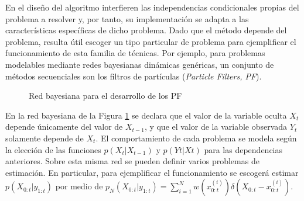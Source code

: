 En el diseño del algoritmo interfieren las independencias condicionales propias del problema a resolver y, por tanto, su implementación se adapta a las características específicas de dicho problema. Dado que el método depende del problema, resulta útil escoger un tipo particular de problema para ejemplificar el funcionamiento de esta familia de técnicas. Por ejemplo, para problemas modelables mediante redes bayesianas dinámicas genéricas, un conjunto de métodos secuenciales son los filtros de partículas (\textit{Particle Filters, PF}).

\begin{figure}[ht]
    \centering
    \caption{Red bayesiana para el desarrollo de los PF}
    \label{fig:3.7}
\end{figure}


En la red bayesiana de la Figura \ref{fig:3.7} se declara que el valor de la variable oculta $X_{t}$ depende únicamente del valor de $X_{t-1}$, y que el valor de la variable observada $Y_{t}$ solamente depende de $X_{t}$. El comportamiento de cada problema se modela según la elección de las funciones $p\left(X_{t}|X_{t-1}\right)$ y $p\left(Y{t}|X{t}\right)$ para las dependencias anteriores. Sobre esta misma red se pueden definir varios problemas de estimación. En particular, para ejemplificar el funcionamiento se escogerá estimar $p\left(X_{0:t}|y_{1:t}\right)$ por medio de $p_{N}\left(X_{0:t}|y_{1:t}\right) = \displaystyle \sum_{i=1}^{N} w\left(x_{0:t}^{(i)}\right) \delta\left(X_{0:t} - x_{0:t}^{(i)}\right)$.

